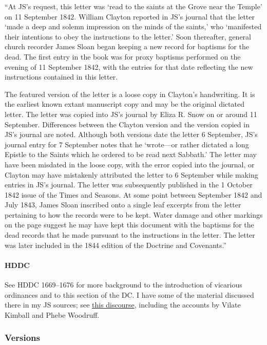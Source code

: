 			``At JS's request, this letter was `read to the saints at the Grove near the Temple' on 11 September 1842. William Clayton reported in JS's journal that the letter `made a deep and solemn impression on the minds of the saints,' who `manifested their intentions to obey the instructions to the letter.' Soon thereafter, general church recorder James Sloan began keeping a new record for baptisms for the dead. The first entry in the book was for proxy baptisms performed on the evening of 11 September 1842, with the entries for that date reflecting the new instructions contained in this letter. 

			The featured version of the letter is a loose copy in Clayton's handwriting. It is the earliest known extant manuscript copy and may be the original dictated letter. The letter was copied into JS's journal by Eliza R. Snow on or around 11 September. Differences between the Clayton version and the version copied in JS's journal are noted. Although both versions date the letter 6 September, JS's journal entry for 7 September notes that he `wrote---or rather dictated a long Epistle to the Saints which he ordered to be read next Sabbath.' The letter may have been misdated in the loose copy, with the error copied into the journal, or Clayton may have mistakenly attributed the letter to 6 September while making entries in JS's journal. The letter was subsequently published in the 1 October 1842 issue of the Times and Seasons. At some point between September 1842 and July 1843, James Sloan inscribed onto a single leaf excerpts from the letter pertaining to how the records were to be kept. Water damage and other markings on the page suggest he may have kept this document with the baptisms for the dead records that he made pursuant to the instructions in the letter. The letter was later included in the 1844 edition of the Doctrine and Covenants.''
			
		\paragraph{HDDC}
		
			See HDDC 1669--1676 for more background to the introduction of vicarious ordinances and to this section of the DC. I have some of the material discussed there in my JS sources; see \hyperref[EMS-1840-JS-3-5-OCT-1840]{this discourse}, including the accounts by Vilate Kimball and Phebe Woodruff.
					
	\subsubsection{Versions}
		\label{DC128-V}
		
